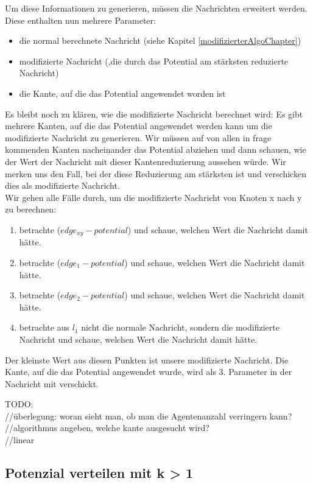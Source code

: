 	Um diese Informationen zu generieren, müssen die Nachrichten erweitert werden.
	Diese enthalten nun mehrere Parameter:
	\begin{itemize}
		\item die normal berechnete Nachricht (siehe Kapitel \ref{modifizierterAlgoChapter})
		\item modifizierte Nachricht (,die durch das Potential am stärksten reduzierte Nachricht)
		\item die Kante, auf die das Potential angewendet worden ist
	\end{itemize}
	Es bleibt noch zu klären, wie die modifizierte Nachricht berechnet wird:
	Es gibt mehrere Kanten, auf die das Potential angewendet werden kann um die modifizierte Nachricht zu generieren. Wir müssen auf von allen in frage kommenden Kanten nacheinander das Potential abziehen und dann schauen, wie der Wert der Nachricht mit dieser Kantenreduzierung aussehen würde. Wir merken uns den Fall, bei der diese Reduzierung am stärksten ist und verschicken dies als modifizierte Nachricht. 
	\\
	Wir gehen alle Fälle durch, um die modifizierte Nachricht von Knoten x nach y zu berechnen:
	\begin{enumerate}
		\item betrachte ($edge_{xy} - potential$) und schaue, welchen Wert die Nachricht damit hätte.
		\item betrachte ($edge_{1} - potential$) und schaue, welchen Wert die Nachricht damit hätte.
		\item betrachte ($edge_{2} - potential$) und schaue, welchen Wert die Nachricht damit hätte.
		\item betrachte aus $l_{1}$ nicht die normale Nachricht, sondern die modifizierte Nachricht und schaue, welchen Wert die Nachricht damit hätte.
	\end{enumerate}
	Der kleinste Wert aus diesen Punkten ist unsere modifizierte Nachricht. Die Kante, auf die das Potential angewendet wurde, wird als 3. Parameter in der Nachricht mit verschickt.
	

TODO:\\
//überlegung: woran sieht man, ob man die Agentenanzahl verringern kann?\\
//algorithmus angeben, welche kante ausgesucht wird?\\
//linear

\subsection{Potenzial verteilen mit k > 1}